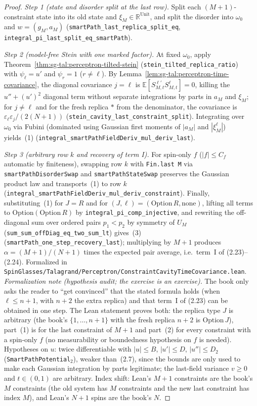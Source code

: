 \begin{proof}
  \leanok
\emph{Step 1 (state and disorder split at the last row).} Split each $(M+1)$-constraint state into its old state and $\xi_M\in\mathbb R^{\mathrm{Unit}}$,
and split the disorder into $\omega_0$ and $w=(g_M,a_M)$ (\texttt{smartPath\_last\_replica\_split\_eq},
\texttt{integral\_pi\_last\_split\_eq\_smartPath}).

\emph{Step 2 (model-free Stein with one marked factor).} At fixed $\omega_0$, apply Theorem~\ref{thm:sg-tal:perceptron-tilted-stein}
(\texttt{stein\_tilted\_replica\_ratio}) with $\psi_\ell=u'$ and $\psi_r=1$ ($r\ne\ell$). By Lemma~\ref{lem:sg-tal:perceptron-time-covariance},
the diagonal covariance $j=\ell$ is $\mathbb E[S^{\ell\prime}_{M,t}S^\ell_{M,t}]=0$, killing the $u''+(u')^2$ diagonal term without separate
integrations by parts in $a_M$ and $\xi_M$; for $j\ne\ell$ and for the fresh replica $*$ from the denominator, the covariance is
$\varepsilon_\ell\varepsilon_j/(2(N+1))$ (\texttt{stein\_cavity\_last\_constraint\_split}). Integrating over $\omega_0$ via Fubini (dominated using
Gaussian first moments of $|a_M|$ and $|\xi_M^\ell|$) yields~(1) (\texttt{integral\_smartPathFieldDeriv\_mul\_deriv\_last}).

\emph{Step 3 (arbitrary row $k$ and recovery of term I).} For spin-only $f$ ($|f|\le C_f$ automatic by finiteness), swapping row $k$ with
\texttt{Fin.last M} via \texttt{smartPathDisorderSwap} and \texttt{smartPathStateSwap} preserves the Gaussian product law and transports~(1)
to row $k$ (\texttt{integral\_smartPathFieldDeriv\_mul\_deriv\_constraint}). Finally, substituting~(1) for $J=R$ and for $(J,\ell)=(\mathrm{Option}\,R,\mathrm{none})$,
lifting all terms to $\mathrm{Option}(\mathrm{Option}\,R)$ by \texttt{integral\_pi\_comp\_injective}, and rewriting the off-diagonal sum over ordered
pairs $p_1<p_2$ by symmetry of $U_M$ (\texttt{sum\_sum\_offDiag\_eq\_two\_sum\_lt}) gives~(3) (\texttt{smartPath\_one\_step\_recovery\_last});
multiplying by $M+1$ produces $\alpha=(M+1)/(N+1)$ times the expected pair average, i.e.\ term~$\mathrm{I}$ of (2.23)--(2.24).
Formalized in \texttt{SpinGlasses/Talagrand/Perceptron/ConstraintCavityTimeCovariance.lean}.
\emph{Formalization note (hypothesis audit; the exercise is an exercise).} The book only asks the reader to ``get convinced''
that the stated formula holds (when $\ell\le n+1$, with $n+2$ the extra replica) and that term~I of (2.23) can be
obtained in one step. The Lean statement proves both: the replica type $J$ is arbitrary (the book's $\{1,\dots,n+1\}$ with
the fresh replica $n+2$ is $\mathrm{Option}\,J$), part~(1) is for the last constraint of $M+1$ and part~(2) for every
constraint with a spin-only $f$ (no measurability or boundedness hypothesis on $f$ is needed). Hypotheses on $u$:
twice differentiable with $|u|\le B$, $|u'|\le D$, $|u''|\le D_2$ (\texttt{SmartPathPotential}$_2$), weaker than~(2.7),
since the bounds are only used to make each Gaussian integration by parts legitimate; the last-field variance $v\ge0$
and $t\in(0,1)$ are arbitrary. Index shift: Lean's $M+1$ constraints are the book's $M$ constraints (the old system has
$M$ constraints and the new last constraint has index $M$), and Lean's $N+1$ spins are the book's $N$.
\end{proof}

